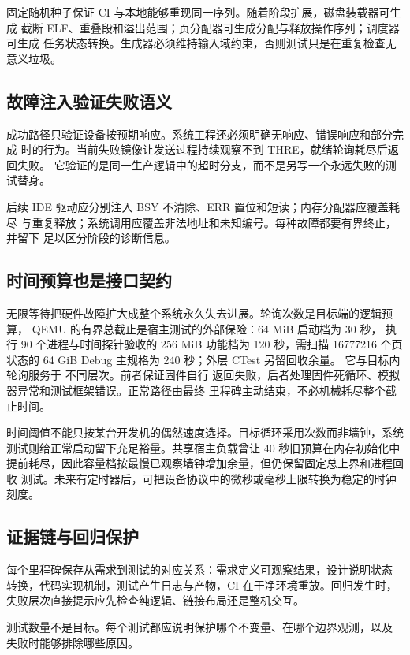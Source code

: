固定随机种子保证 CI 与本地能够重现同一序列。随着阶段扩展，磁盘装载器可生成
截断 ELF、重叠段和溢出范围；页分配器可生成分配与释放操作序列；调度器可生成
任务状态转换。生成器必须维持输入域约束，否则测试只是在重复检查无意义垃圾。

\subsection{故障注入验证失败语义}

成功路径只验证设备按预期响应。系统工程还必须明确无响应、错误响应和部分完成
时的行为。当前失败镜像让发送过程持续观察不到 THRE，就绪轮询耗尽后返回失败。
它验证的是同一生产逻辑中的超时分支，而不是另写一个永远失败的测试替身。

后续 IDE 驱动应分别注入 BSY 不清除、ERR 置位和短读；内存分配器应覆盖耗尽
与重复释放；系统调用应覆盖非法地址和未知编号。每种故障都要有界终止，并留下
足以区分阶段的诊断信息。

\subsection{时间预算也是接口契约}

无限等待把硬件故障扩大成整个系统永久失去进展。轮询次数是目标端的逻辑预算，
QEMU 的有界总截止是宿主测试的外部保险：64 MiB 启动档为 30 秒，
执行 90 个进程与时间探针验收的 256 MiB 功能档为 120 秒，需扫描
16777216 个页状态的 64 GiB Debug 主规格为 240 秒；外层 CTest 另留回收余量。
它与目标内轮询服务于
不同层次。前者保证固件自行
返回失败，后者处理固件死循环、模拟器异常和测试框架错误。正常路径由最终
里程碑主动结束，不必机械耗尽整个截止时间。

时间阈值不能只按某台开发机的偶然速度选择。目标循环采用次数而非墙钟，系统
测试则给正常启动留下充足裕量。共享宿主负载曾让 40 秒旧预算在内存初始化中
提前耗尽，因此容量档按最慢已观察墙钟增加余量，但仍保留固定总上界和进程回收
测试。未来有定时器后，可把设备协议中的微秒或毫秒上限转换为稳定的时钟刻度。

\subsection{证据链与回归保护}

每个里程碑保存从需求到测试的对应关系：需求定义可观察结果，设计说明状态
转换，代码实现机制，测试产生日志与产物，CI 在干净环境重放。回归发生时，
失败层次直接提示应先检查纯逻辑、链接布局还是整机交互。

\begin{keyidea}
测试数量不是目标。每个测试都应说明保护哪个不变量、在哪个边界观测，以及
失败时能够排除哪些原因。
\end{keyidea}
